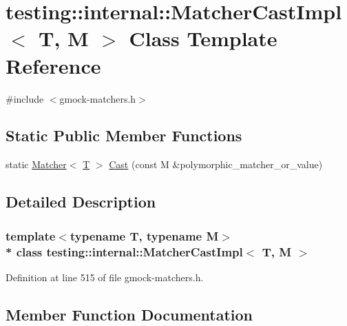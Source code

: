 \hypertarget{classtesting_1_1internal_1_1_matcher_cast_impl}{}\section{testing\+:\+:internal\+:\+:Matcher\+Cast\+Impl$<$ T, M $>$ Class Template Reference}
\label{classtesting_1_1internal_1_1_matcher_cast_impl}


{\ttfamily \#include $<$gmock-\/matchers.\+h$>$}

\subsection*{Static Public Member Functions}
\begin{DoxyCompactItemize}
\item 
static \hyperlink{classtesting_1_1_matcher}{Matcher}$<$ \hyperlink{functions__7_8js_adf1f3edb9115acb0a1e04209b7a9937b}{T} $>$ \hyperlink{classtesting_1_1internal_1_1_matcher_cast_impl_a488bb69a7845f9198bbb198d8dbe41a8}{Cast} (const M \&polymorphic\+\_\+matcher\+\_\+or\+\_\+value)
\end{DoxyCompactItemize}


\subsection{Detailed Description}
\subsubsection*{template$<$typename T, typename M$>$\\*
class testing\+::internal\+::\+Matcher\+Cast\+Impl$<$ T, M $>$}



Definition at line 515 of file gmock-\/matchers.\+h.



\subsection{Member Function Documentation}
